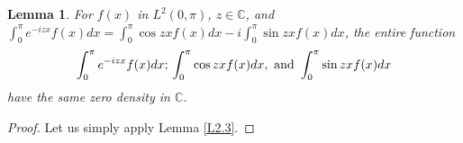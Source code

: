 \documentclass[10pt,a4paper]{article}
\theoremstyle{plain}
\newtheorem{lemma}[theorem]{Lemma}
\theoremstyle{definition}
\theoremstyle{remark}
\numberwithin{equation}{section}
\begin{document}
\begin{lemma}\label{L2.4}
For $f(x)$ in $L^{2}(0,\pi)$, $z\in\mathbb{C}$, and $\int_{0}^{\pi}e^{-iz x}f(x)dx=\int_{0}^{\pi}\cos{z x}f(x)dx-i\int_{0}^{\pi}\sin{z x}f(x)dx$, the entire function $$\int_{0}^{\pi}e^{-iz x}f(x)dx;\\ \int_{0}^{\pi}\cos{z x}f(x)dx,\mbox{ and }\int_{0}^{\pi}\sin{z x}f(x)dx$$ have the same zero density in $\mathbb{C}$.
\end{lemma}
\begin{proof}
Let us simply apply Lemma \ref{L2.3}.

\end{proof}

\end{document}
